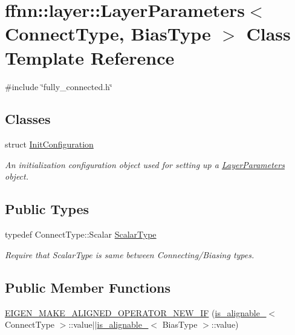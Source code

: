 \hypertarget{classffnn_1_1layer_1_1_layer_parameters}{\section{ffnn\-:\-:layer\-:\-:Layer\-Parameters$<$ Connect\-Type, Bias\-Type $>$ Class Template Reference}
\label{classffnn_1_1layer_1_1_layer_parameters}
}


{\ttfamily \#include \char`\"{}fully\-\_\-connected.\-h\char`\"{}}

\subsection*{Classes}
\begin{DoxyCompactItemize}
\item 
struct \hyperlink{structffnn_1_1layer_1_1_layer_parameters_1_1_init_configuration}{Init\-Configuration}
\begin{DoxyCompactList}\small\item\em An initialization configuration object used for setting up a \hyperlink{classffnn_1_1layer_1_1_layer_parameters}{Layer\-Parameters} object. \end{DoxyCompactList}\end{DoxyCompactItemize}
\subsection*{Public Types}
\begin{DoxyCompactItemize}
\item 
typedef Connect\-Type\-::\-Scalar \hyperlink{classffnn_1_1layer_1_1_layer_parameters_a3dd1354de05cbf7c05d82a8ed653714e}{Scalar\-Type}
\begin{DoxyCompactList}\small\item\em Require that Scalar\-Type is same between Connecting/\-Biasing types. \end{DoxyCompactList}\end{DoxyCompactItemize}
\subsection*{Public Member Functions}
\begin{DoxyCompactItemize}
\item 
\hyperlink{classffnn_1_1layer_1_1_layer_parameters_a9151744c5910c264d1ed64d5a31d2e60}{E\-I\-G\-E\-N\-\_\-\-M\-A\-K\-E\-\_\-\-A\-L\-I\-G\-N\-E\-D\-\_\-\-O\-P\-E\-R\-A\-T\-O\-R\-\_\-\-N\-E\-W\-\_\-\-I\-F} (\hyperlink{structffnn_1_1layer_1_1is__alignable__128}{is\-\_\-alignable\-\_}$<$ Connect\-Type $>$\-::value$\vert$$\vert$\hyperlink{structffnn_1_1layer_1_1is__alignable__128}{is\-\_\-alignable\-\_}$<$ Bias\-Type $>$\-::value)
\end{DoxyCompactItemize}


